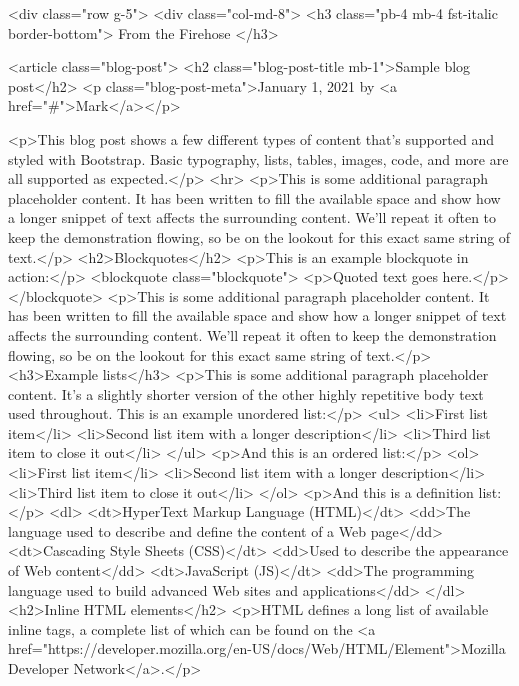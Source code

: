   <div class="row g-5">
    <div class="col-md-8">
      <h3 class="pb-4 mb-4 fst-italic border-bottom">
        From the Firehose
      </h3>

      <article class="blog-post">
        <h2 class="blog-post-title mb-1">Sample blog post</h2>
        <p class="blog-post-meta">January 1, 2021 by <a href="#">Mark</a></p>

        <p>This blog post shows a few different types of content that’s supported and styled with Bootstrap. Basic typography, lists, tables, images, code, and more are all supported as expected.</p>
        <hr>
        <p>This is some additional paragraph placeholder content. It has been written to fill the available space and show how a longer snippet of text affects the surrounding content. We'll repeat it often to keep the demonstration flowing, so be on the lookout for this exact same string of text.</p>
        <h2>Blockquotes</h2>
        <p>This is an example blockquote in action:</p>
        <blockquote class="blockquote">
          <p>Quoted text goes here.</p>
        </blockquote>
        <p>This is some additional paragraph placeholder content. It has been written to fill the available space and show how a longer snippet of text affects the surrounding content. We'll repeat it often to keep the demonstration flowing, so be on the lookout for this exact same string of text.</p>
        <h3>Example lists</h3>
        <p>This is some additional paragraph placeholder content. It's a slightly shorter version of the other highly repetitive body text used throughout. This is an example unordered list:</p>
        <ul>
          <li>First list item</li>
          <li>Second list item with a longer description</li>
          <li>Third list item to close it out</li>
        </ul>
        <p>And this is an ordered list:</p>
        <ol>
          <li>First list item</li>
          <li>Second list item with a longer description</li>
          <li>Third list item to close it out</li>
        </ol>
        <p>And this is a definition list:</p>
        <dl>
          <dt>HyperText Markup Language (HTML)</dt>
          <dd>The language used to describe and define the content of a Web page</dd>
          <dt>Cascading Style Sheets (CSS)</dt>
          <dd>Used to describe the appearance of Web content</dd>
          <dt>JavaScript (JS)</dt>
          <dd>The programming language used to build advanced Web sites and applications</dd>
        </dl>
        <h2>Inline HTML elements</h2>
        <p>HTML defines a long list of available inline tags, a complete list of which can be found on the <a href="https://developer.mozilla.org/en-US/docs/Web/HTML/Element">Mozilla Developer Network</a>.</p>
